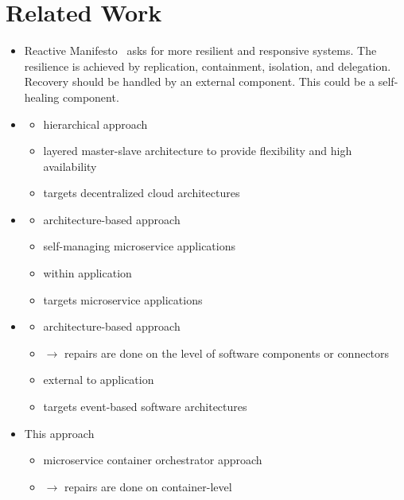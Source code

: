  
\section{Related Work}
  \begin{itemize}
    \item Reactive Manifesto~\cite{reactivemanifesto} asks for more resilient and responsive systems.
      The resilience is achieved by replication, containment, isolation, and delegation.
      Recovery should be handled by an external component.
      This could be a self-healing component.
    \item \cite{StackCloud}
      \begin{itemize}
        \item hierarchical approach
        \item layered master-slave architecture to provide flexibility and high availability
        \item targets decentralized cloud architectures
      \end{itemize}
    \item \cite{ToffettiMicroservices}
      \begin{itemize}
        \item architecture-based approach
        \item self-managing microservice applications
        \item within application
        \item targets microservice applications
      \end{itemize}
    \item \cite{DashofyArchitecture}
      \begin{itemize}
        \item architecture-based approach
        \item $\rightarrow$ repairs are done on the level of software components or connectors
        \item external to application
        \item targets event-based software architectures
      \end{itemize}
    \item This approach
      \begin{itemize}
        \item microservice container orchestrator approach
        \item $\rightarrow$ repairs are done on container-level

\end{itemize}
\end{itemize}
